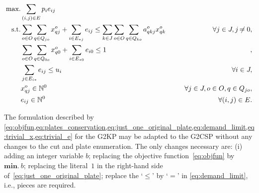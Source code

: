 \documentclass[9pt]{entcs}
\begin{document}
\begin{align}
\mbox{max.} &\sum_{(i, j) \in E} p_i e_{ij} \label{eq:objfun}\\
\mbox{s.t.} &\sum_{o \in O}\sum_{q \in Q_{jo}} x^o_{qj} + \sum_{i \in E_{*j}} e_{ij} \leq \sum_{k \in J}\sum_{o \in O}\sum_{q \in Q_{ko}} a^o_{qkj} x^o_{qk} \hspace*{0.05\textwidth} & \forall j \in J, j \neq 0,\label{eq:plates_conservation}\\
	& \sum_{o \in O}\sum_{q \in Q_{0o}} x^o_{q0} + \sum_{i \in E_{*0}} e_{i0} \leq 1 &,\label{eq:just_one_original_plate}\\
	& \sum_{j \in E_{i*}} e_{ij} \leq u_i & \forall i \in \bar{J},\label{eq:demand_limit}\\
	& x^o_{qj} \in \mathbb{N}^0 & \forall j \in J, o \in O, q \in Q_{jo},\label{eq:trivial_x}\\
	& e_{ij} \in \mathbb{N}^0 & \forall (i, j) \in E.\label{eq:trivial_e}
\end{align}
\begin{comment}
\begin{align}
\bm{max.} &\sum_{(i, j) \in E} p_i e_{ij} \label{eq:objfun}\\
\bm{s.t.} &\specialcell{\sum_{o \in O}\sum_{q \in Q_{jo}} x^o_{qj} + \sum_{i \in E_{*j}} e_{ij} \leq \sum_{k \in J}\sum_{o \in O}\sum_{q \in Q_{ko}} a^o_{qkj} x^o_{qk} \hspace*{0.05\textwidth} \forall j \in J, j \neq 0,}\label{eq:plates_conservation}\\
	    & \specialcell{\sum_{o \in O}\sum_{q \in Q_{0o}} x^o_{q0} + \sum_{i \in E_{*0}} e_{i0} \leq 1 \hspace*{\fill},}\label{eq:just_one_original_plate}\\
            & \specialcell{\sum_{j \in E_{i*}} e_{ij} \leq u_i \hspace*{\fill} \forall i \in \bar{J},}\label{eq:demand_limit}\\
	    & \specialcell{x^o_{qj} \in \mathbb{N}^0 \hspace*{\fill} \forall j \in J, o \in O, q \in Q_{jo},}\label{eq:trivial_x}\\
            & \specialcell{e_{ij} \in \mathbb{N}^0 \hspace*{\fill} \forall (i, j) \in E.}\label{eq:trivial_e}
\end{align}
\end{comment}

The formulation described by \cref{eq:objfun,eq:plates_conservation,eq:just_one_original_plate,eq:demand_limit,eq:trivial_x,eq:trivial_e} for the G2KP may be adapted to the G2CSP without any changes to the cut and plate enumeration.
The only changes necessary are: (i) adding an integer variable \(b\); replacing the objective function~\cref{eq:objfun} by~\(\bm{min.}~b\); replacing the literal~\(1\) in the right-hand side of~\cref{eq:just_one_original_plate}; replace the `\(\leq\)' by `\(=\)' in \eqref{eq:demand_limit}, i.e., pieces are required.
\end{document}
